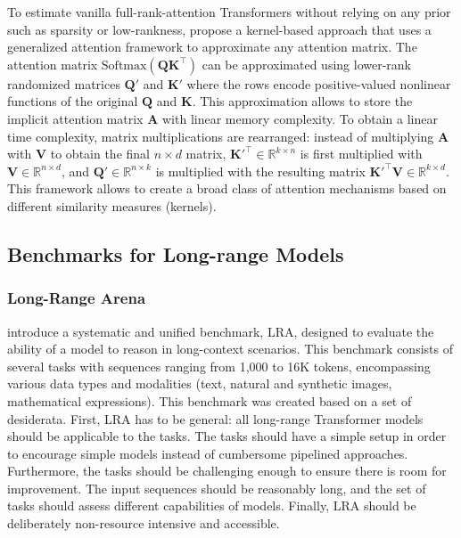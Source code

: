 To estimate vanilla full-rank-attention Transformers without relying on any prior such as sparsity or low-rankness, \citet{choromanski2020rethinking} propose a kernel-based approach that uses a generalized
attention framework to approximate any attention matrix. The attention matrix $\text{Softmax}(\bm{Q}\bm{K}^{\top})$ can be approximated using lower-rank randomized matrices $\bm{Q'}$ and $\bm{K'}$ where the rows encode positive-valued nonlinear functions of the original $\bm{Q}$ and $\bm{K}$. This approximation allows to store the implicit attention matrix $\bm{A}$ with
linear memory complexity. To obtain a linear time complexity, matrix multiplications are rearranged: instead of multiplying $\bm{A}$ with $\bm{V}$ to obtain the final $n \times d$ matrix, $\bm{K'}^{\top} \in \mathbb{R}^{k \times n}$ is first multiplied with $\bm{V} \in \mathbb{R}^{n \times d}$, and $\bm{Q'} \in \mathbb{R}^{n \times k}$ is multiplied with the resulting matrix $\bm{K'}^{\top} \bm{V} \in \mathbb{R}^{k \times d}$. This framework allows to create a broad class of attention mechanisms based on different similarity measures (kernels).


\subsection{Benchmarks for Long-range Models}

\subsubsection{Long-Range Arena}

\citet{tay2020long} introduce a systematic and unified benchmark, \ac{LRA}, designed to evaluate the ability of a model to reason in long-context scenarios. This benchmark consists of several tasks with sequences ranging from 1,000 to 16K tokens, encompassing various data types and modalities (text, natural and synthetic images, mathematical expressions). This benchmark was created based on a set of desiderata. First, \ac{LRA} has to be general: all long-range Transformer models should be applicable to the tasks. The tasks should have a simple setup in order to encourage simple models instead of cumbersome pipelined approaches. Furthermore, the tasks should be challenging enough to ensure there is room for improvement. The input sequences should be reasonably long, and the set of tasks should assess different capabilities of models. Finally, \ac{LRA} should be deliberately non-resource intensive and accessible.

